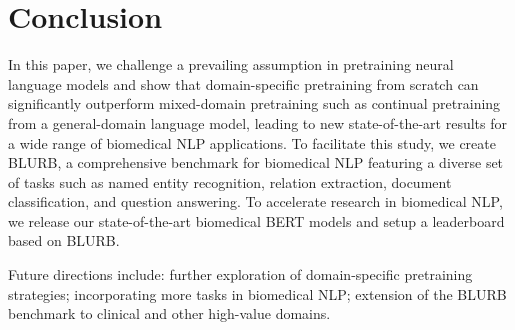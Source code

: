 \documentclass[acmlarge,screen,nonacm]{acmart}
\begin{document}
 \section{Conclusion}
\label{sec:conclusion}


In this paper, we challenge a prevailing assumption in pretraining neural language models and show that domain-specific pretraining from scratch can significantly outperform mixed-domain pretraining such as continual pretraining from a general-domain language model, leading to new state-of-the-art results for a wide range of biomedical NLP applications. 
To facilitate this study, we create BLURB, a comprehensive benchmark for biomedical NLP featuring a diverse set of tasks such as named entity recognition, relation extraction, document classification, and question answering. To accelerate research in biomedical NLP, we release our state-of-the-art biomedical BERT models and setup a leaderboard based on BLURB.

Future directions include: further exploration of domain-specific pretraining strategies; incorporating more tasks in biomedical NLP; extension of the BLURB benchmark to clinical and other high-value domains. 






















\end{document}

